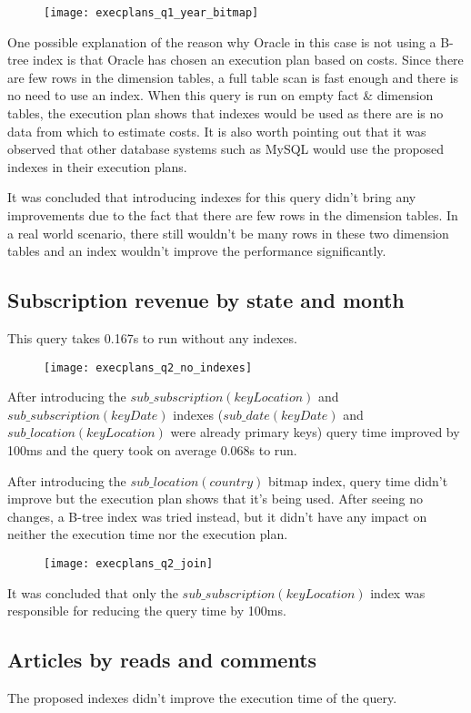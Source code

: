 \begin{figure}[!htp]
\begin{center}
  \texttt{[image: execplans\_q1\_year\_bitmap]}
\end{center}
\end{figure}

One possible explanation of the reason why Oracle in this case is not using a B-tree index is that Oracle has chosen an execution plan based on costs. Since there are few rows in the dimension tables, a full table scan is fast enough and there is no need to use an index. When this query is run on empty fact \& dimension tables, the execution plan shows that indexes would be used as there are is no data from which to estimate costs. It is also worth pointing out that it was observed that other database systems such as MySQL would use the proposed indexes in their execution plans.

It was concluded that introducing indexes for this query didn't bring any improvements due to the fact that there are few rows in the dimension tables. In a real world scenario, there still wouldn't be many rows in these two dimension tables and an index wouldn't improve the performance significantly.

\subsection*{Subscription revenue by state and month} 
This query takes 0.167s to run without any indexes.

\begin{figure}[!htp]
\begin{center}
  \texttt{[image: execplans\_q2\_no\_indexes]}
\end{center}
\end{figure}

After introducing the $sub\_subscription(keyLocation)$ and $sub\_subscription(keyDate)$ indexes ($sub\_date(keyDate)$ and $sub\_location(keyLocation)$ were already primary keys) query time improved by 100ms and the query took on average 0.068s to run.

After introducing the $sub\_location(country)$ bitmap index, query time didn't improve but the execution plan shows that it's being used. After seeing no changes, a B-tree index was tried instead, but it didn't have any impact on neither the execution time nor the execution plan.

\begin{figure}[!hbp]
\begin{center}
  \texttt{[image: execplans\_q2\_join]}
\end{center}
\end{figure}

It was concluded that only the $sub\_subscription(keyLocation)$ index was responsible for reducing the query time by 100ms.

\subsection*{Articles by reads and comments}

The proposed indexes didn't improve the execution time of the query.
